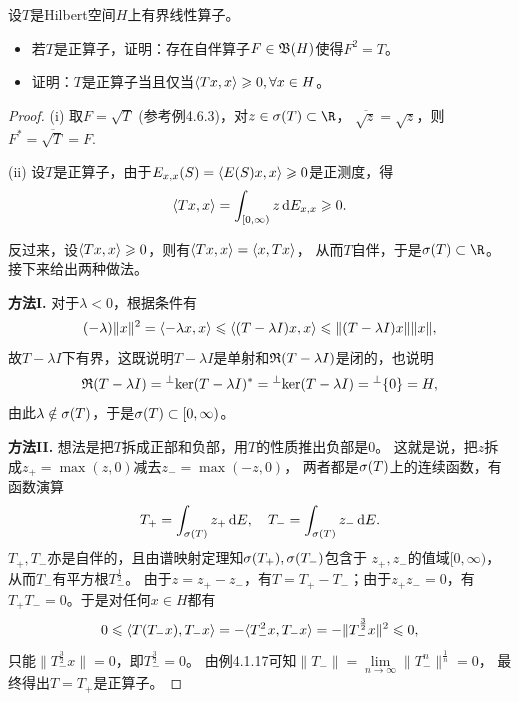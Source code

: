 \begin{9}
设$T$是Hilbert空间$H$上有界线性算子。
\begin{itemize}
    \item[(i)] 若$T$是正算子，证明：存在自伴算子$F\in\mathfrak{B}(H)$使得$F^2=T$。
    \item[(ii)] 证明：$T$是正算子当且仅当$\langle Tx,x \rangle\geqslant0,\forall x \in H$。
\end{itemize}
\end{9}
\begin{proof}
(i) 取$F=\sqrt{T}$ (参考例4.6.3)，对$z\in\s(T)\subset\R$，
$\overline{\sqrt{z}}=\sqrt{z}$，则$F^*=\overline{\sqrt{T}}=F$.

(ii) 设$T$是正算子，由于$E_{x,x}(S)=\langle E(S)x,x\rangle\geqslant0$是正测度，得
\[\langle Tx,x\rangle=\int_{[0,\infty)}z\,{\rm d}E_{x,x}\geqslant0.\]

反过来，设$\langle Tx,x\rangle\geqslant0$，则有$\langle Tx,x\rangle=\langle x,Tx\rangle$，
从而$T$自伴，于是$\s(T)\subset\R$。接下来给出两种做法。

\textbf{方法I.} 对于$\lambda<0$，根据条件有
$$(-\lambda)\|x\|^2=\langle-\lambda x,x\rangle
\leqslant\langle(T-\lambda I)x,x\rangle\leqslant\|(T-\lambda I)x\|\|x\|,$$
故$T-\lambda I$下有界，这既说明$T-\lambda I$是单射和$\mathfrak{R}(T-\lambda I)$是闭的，也说明
\[\mathfrak{R}(T-\lambda I)={ }^\perp\!\ker(T-\lambda I)^*
={ }^\perp\!\ker(T-\lambda I)={ }^\perp\{0\}=H,\]
由此$\lambda\notin\sigma(T)$，于是$\sigma(T)\subset[0,\infty)$。

\textbf{方法II.} 想法是把$T$拆成正部和负部，用$T$的性质推出负部是$0$。
这就是说，把$z$拆成$z_+ = \max(z,0)$减去$z_- = \max(-z,0)$，
两者都是$\sigma(T)$上的连续函数，有函数演算
\[T_+ = \int_{\sigma(T)} z_+\,{\rm d}E,\quad T_- = \int_{\sigma(T)} z_-\,{\rm d}E.\]
$T_+,T_-$亦是自伴的，且由谱映射定理知$\sigma(T_+),\sigma(T_-)$包含于
$z_+,z_-$的值域$[0,\infty)$，从而$T_-$有平方根$T_-^\frac{1}{2}$。
由于$z = z_+ - z_-$，有$T = T_+-T_-$；由于$z_+z_- = 0$，有$T_+T_- = 0$。于是对任何$x \in H$都有
\[0 \leqslant \langle T(T_-x),T_-x \rangle = - \langle T_-^2x,T_- x \rangle
= - \|T_-^\frac{3}{2}x\|^2 \leqslant 0,\]
只能$\|T_-^\frac{3}{2}x\| = 0$，即$T_-^\frac{3}{2} = 0$。
由例4.1.17可知$\|T_-\| = \lim\limits_{n \to \infty}\|T_-^n\|^\frac{1}{n} = 0$，
最终得出$T = T_+$是正算子。
\end{proof}

